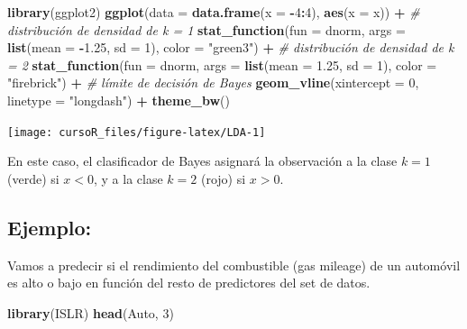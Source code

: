 \documentclass[]{book}
\newenvironment{Shaded}{\begin{snugshade}}{\end{snugshade}}
\newcommand{\KeywordTok}[1]{\textcolor[rgb]{0.13,0.29,0.53}{\textbf{#1}}}
\newcommand{\DataTypeTok}[1]{\textcolor[rgb]{0.13,0.29,0.53}{#1}}
\newcommand{\DecValTok}[1]{\textcolor[rgb]{0.00,0.00,0.81}{#1}}
\newcommand{\FloatTok}[1]{\textcolor[rgb]{0.00,0.00,0.81}{#1}}
\newcommand{\StringTok}[1]{\textcolor[rgb]{0.31,0.60,0.02}{#1}}
\newcommand{\CommentTok}[1]{\textcolor[rgb]{0.56,0.35,0.01}{\textit{#1}}}
\newcommand{\OperatorTok}[1]{\textcolor[rgb]{0.81,0.36,0.00}{\textbf{#1}}}
\newcommand{\NormalTok}[1]{#1}
\begin{document}
\begin{Shaded}
\begin{Highlighting}[]
\KeywordTok{library}\NormalTok{(ggplot2)}
\KeywordTok{ggplot}\NormalTok{(}\DataTypeTok{data =} \KeywordTok{data.frame}\NormalTok{(}\DataTypeTok{x =} \OperatorTok{-}\DecValTok{4}\OperatorTok{:}\DecValTok{4}\NormalTok{), }\KeywordTok{aes}\NormalTok{(}\DataTypeTok{x =}\NormalTok{ x)) }\OperatorTok{+}
\CommentTok{# distribución de densidad de k = 1}
\KeywordTok{stat_function}\NormalTok{(}\DataTypeTok{fun =}\NormalTok{ dnorm,}
\DataTypeTok{args =} \KeywordTok{list}\NormalTok{(}\DataTypeTok{mean =} \OperatorTok{-}\FloatTok{1.25}\NormalTok{, }\DataTypeTok{sd =} \DecValTok{1}\NormalTok{),}
\DataTypeTok{color =} \StringTok{"green3"}\NormalTok{) }\OperatorTok{+}
\CommentTok{# distribución de densidad de k = 2}
\KeywordTok{stat_function}\NormalTok{(}\DataTypeTok{fun =}\NormalTok{ dnorm,}
\DataTypeTok{args =} \KeywordTok{list}\NormalTok{(}\DataTypeTok{mean =} \FloatTok{1.25}\NormalTok{, }\DataTypeTok{sd =} \DecValTok{1}\NormalTok{),}
\DataTypeTok{color =} \StringTok{"firebrick"}\NormalTok{) }\OperatorTok{+}\StringTok{ }\CommentTok{# límite de decisión de Bayes}
\KeywordTok{geom_vline}\NormalTok{(}\DataTypeTok{xintercept =} \DecValTok{0}\NormalTok{,}
\DataTypeTok{linetype =} \StringTok{"longdash"}\NormalTok{) }\OperatorTok{+}
\KeywordTok{theme_bw}\NormalTok{()}
\end{Highlighting}
\end{Shaded}

\begin{center}\texttt{[image: cursoR\_files/figure-latex/LDA-1]} \end{center}

En este caso, el clasificador de Bayes asignará la observación a la
clase \(k = 1\) (verde) si \(x < 0\), y a la clase \(k = 2\) (rojo) si
\(x > 0\).

\subsection{Ejemplo:}\label{ejemplo-1}

Vamos a predecir si el rendimiento del combustible (gas mileage) de un
automóvil es alto o bajo en función del resto de predictores del set de
datos.

\begin{Shaded}
\begin{Highlighting}[]
\KeywordTok{library}\NormalTok{(ISLR)}
\KeywordTok{head}\NormalTok{(Auto, }\DecValTok{3}\NormalTok{)}
\end{Highlighting}
\end{Shaded}
\end{document}
